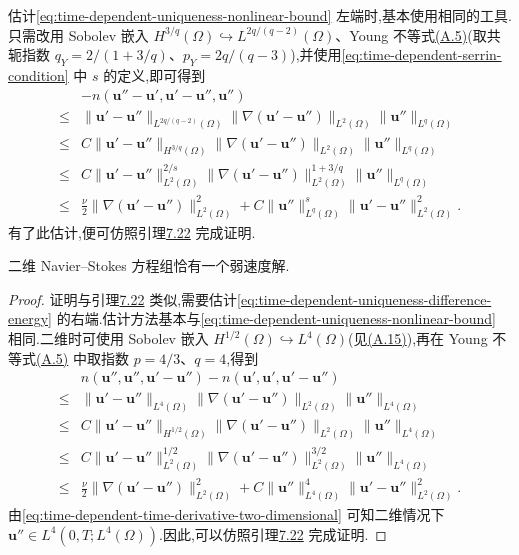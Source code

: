 \begin{note}
估计\cref{eq:time-dependent-uniqueness-nonlinear-bound} 左端时,基本使用相同的工具.只需改用 Sobolev 嵌入 $H^{3/q}(\Omega)\hookrightarrow L^{2q/(q-2)}(\Omega)$、Young 不等式\hyperref[eq:appendix-a-5]{(A.5)}(取共轭指数 $q_Y=2/(1+3/q)$、$p_Y=2q/(q-3)$),并使用\cref{eq:time-dependent-serrin-condition} 中 $s$ 的定义,即可得到
\[
\begin{aligned}
  &-n(\bm{u}''-\bm{u}',\bm{u}'-\bm{u}'',\bm{u}'')\\
  \le{}&\|\bm{u}'-\bm{u}''\|_{L^{2q/(q-2)}(\Omega)}
         \|\nabla(\bm{u}'-\bm{u}'')\|_{L^2(\Omega)}
         \|\bm{u}''\|_{L^q(\Omega)}\\
  \le{}&C\|\bm{u}'-\bm{u}''\|_{H^{3/q}(\Omega)}
         \|\nabla(\bm{u}'-\bm{u}'')\|_{L^2(\Omega)}
         \|\bm{u}''\|_{L^q(\Omega)}\\
  \le{}&C\|\bm{u}'-\bm{u}''\|_{L^2(\Omega)}^{2/s}
         \|\nabla(\bm{u}'-\bm{u}'')\|_{L^2(\Omega)}^{1+3/q}
         \|\bm{u}''\|_{L^q(\Omega)}\\
  \le{}&\frac{\nu}{2}
         \|\nabla(\bm{u}'-\bm{u}'')\|_{L^2(\Omega)}^2
       +C\|\bm{u}''\|_{L^q(\Omega)}^s
         \|\bm{u}'-\bm{u}''\|_{L^2(\Omega)}^2.
\end{aligned}
\]
有了此估计,便可仿照引理\hyperref[lem:time-dependent-weak-solution-uniqueness]{7.22} 完成证明.
\end{note}

\begin{theorem}[二维情形弱解的唯一性]\label{thm:time-dependent-two-dimensional-uniqueness}
二维 Navier--Stokes 方程组恰有一个弱速度解.
\begin{proof}
证明与引理\hyperref[lem:time-dependent-weak-solution-uniqueness]{7.22} 类似,需要估计\cref{eq:time-dependent-uniqueness-difference-energy} 的右端.估计方法基本与\cref{eq:time-dependent-uniqueness-nonlinear-bound} 相同.二维时可使用 Sobolev 嵌入 $H^{1/2}(\Omega)\hookrightarrow L^4(\Omega)$(见\hyperref[eq:appendix-a-15]{(A.15)}),再在 Young 不等式\hyperref[eq:appendix-a-5]{(A.5)} 中取指数 $p=4/3$、$q=4$,得到
\[
\begin{aligned}
  &n(\bm{u}'',\bm{u}'',\bm{u}'-\bm{u}'')
    -n(\bm{u}',\bm{u}',\bm{u}'-\bm{u}'')\\
  \le{}&\|\bm{u}'-\bm{u}''\|_{L^4(\Omega)}
         \|\nabla(\bm{u}'-\bm{u}'')\|_{L^2(\Omega)}
         \|\bm{u}''\|_{L^4(\Omega)}\\
  \le{}&C\|\bm{u}'-\bm{u}''\|_{H^{1/2}(\Omega)}
         \|\nabla(\bm{u}'-\bm{u}'')\|_{L^2(\Omega)}
         \|\bm{u}''\|_{L^4(\Omega)}\\
  \le{}&C\|\bm{u}'-\bm{u}''\|_{L^2(\Omega)}^{1/2}
         \|\nabla(\bm{u}'-\bm{u}'')\|_{L^2(\Omega)}^{3/2}
         \|\bm{u}''\|_{L^4(\Omega)}\\
  \le{}&\frac{\nu}{2}
         \|\nabla(\bm{u}'-\bm{u}'')\|_{L^2(\Omega)}^2
       +C\|\bm{u}''\|_{L^4(\Omega)}^4
         \|\bm{u}'-\bm{u}''\|_{L^2(\Omega)}^2.
\end{aligned}
\]
由\cref{eq:time-dependent-time-derivative-two-dimensional} 可知二维情况下
$\bm{u}''\in L^4(0,T;L^4(\Omega))$.因此,可以仿照引理\hyperref[lem:time-dependent-weak-solution-uniqueness]{7.22} 完成证明.
\end{proof}
\end{theorem}

